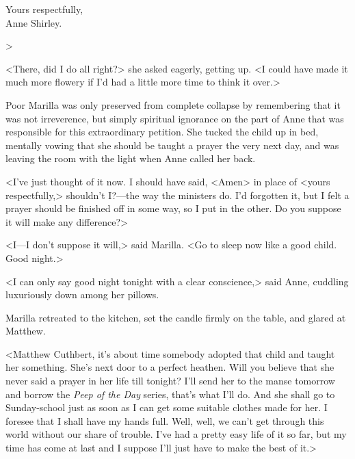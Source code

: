 \begin{flushright}
Yours respectfully,\\
Anne Shirley.\end{flushright}>

<There, did I do all right?> she asked eagerly, getting up. <I could have made it much more flowery if I'd had a little more time to think it over.>

Poor Marilla was only preserved from complete collapse by remembering that it was not irreverence, but simply spiritual ignorance on the part of Anne that was responsible for this extraordinary petition. She tucked the child up in bed, mentally vowing that she should be taught a prayer the very next day, and was leaving the room with the light when Anne called her back.

<I've just thought of it now. I should have said, <Amen> in place of <yours respectfully,> shouldn't I\@?—the way the ministers do. I'd forgotten it, but I felt a prayer should be finished off in some way, so I put in the other. Do you suppose it will make any difference?>

<I—I don't suppose it will,> said Marilla. <Go to sleep now like a good child. Good night.>

<I can only say good night tonight with a clear conscience,> said Anne, cuddling luxuriously down among her pillows.

Marilla retreated to the kitchen, set the candle firmly on the table, and glared at Matthew.

<Matthew Cuthbert, it's about time somebody adopted that child and taught her something. She's next door to a perfect heathen. Will you believe that she never said a prayer in her life till tonight? I'll send her to the manse tomorrow and borrow the \textit{Peep of the Day} series, that's what I'll do. And she shall go to Sunday-school just as soon as I can get some suitable clothes made for her. I foresee that I shall have my hands full. Well, well, we can't get through this world without our share of trouble. I've had a pretty easy life of it so far, but my time has come at last and I suppose I'll just have to make the best of it.>